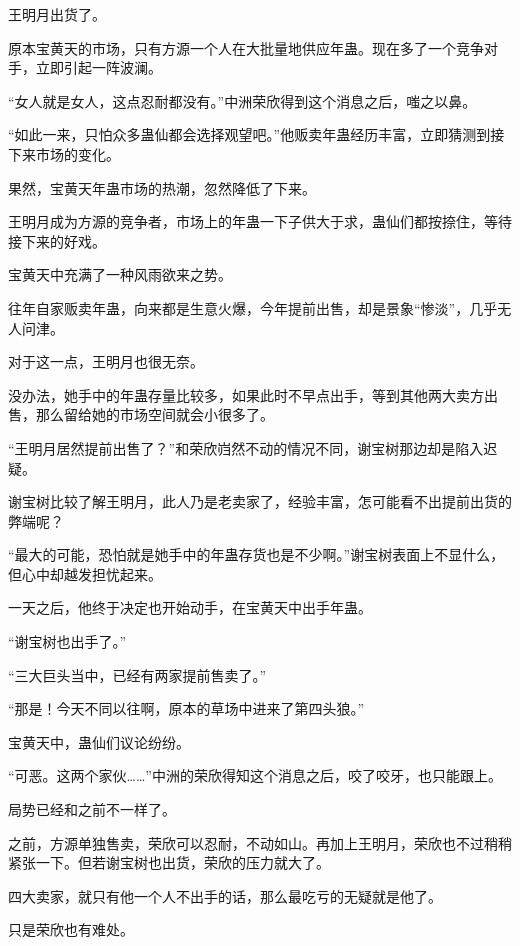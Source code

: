 
\begin{this_body}

王明月出货了。

原本宝黄天的市场，只有方源一个人在大批量地供应年蛊。现在多了一个竞争对手，立即引起一阵波澜。

“女人就是女人，这点忍耐都没有。”中洲荣欣得到这个消息之后，嗤之以鼻。

“如此一来，只怕众多蛊仙都会选择观望吧。”他贩卖年蛊经历丰富，立即猜测到接下来市场的变化。

果然，宝黄天年蛊市场的热潮，忽然降低了下来。

王明月成为方源的竞争者，市场上的年蛊一下子供大于求，蛊仙们都按捺住，等待接下来的好戏。

宝黄天中充满了一种风雨欲来之势。

往年自家贩卖年蛊，向来都是生意火爆，今年提前出售，却是景象“惨淡”，几乎无人问津。

对于这一点，王明月也很无奈。

没办法，她手中的年蛊存量比较多，如果此时不早点出手，等到其他两大卖方出售，那么留给她的市场空间就会小很多了。

“王明月居然提前出售了？”和荣欣岿然不动的情况不同，谢宝树那边却是陷入迟疑。

谢宝树比较了解王明月，此人乃是老卖家了，经验丰富，怎可能看不出提前出货的弊端呢？

“最大的可能，恐怕就是她手中的年蛊存货也是不少啊。”谢宝树表面上不显什么，但心中却越发担忧起来。

一天之后，他终于决定也开始动手，在宝黄天中出手年蛊。

“谢宝树也出手了。”

“三大巨头当中，已经有两家提前售卖了。”

“那是！今天不同以往啊，原本的草场中进来了第四头狼。”

宝黄天中，蛊仙们议论纷纷。

“可恶。这两个家伙……”中洲的荣欣得知这个消息之后，咬了咬牙，也只能跟上。

局势已经和之前不一样了。

之前，方源单独售卖，荣欣可以忍耐，不动如山。再加上王明月，荣欣也不过稍稍紧张一下。但若谢宝树也出货，荣欣的压力就大了。

四大卖家，就只有他一个人不出手的话，那么最吃亏的无疑就是他了。

只是荣欣也有难处。


\end{this_body}

